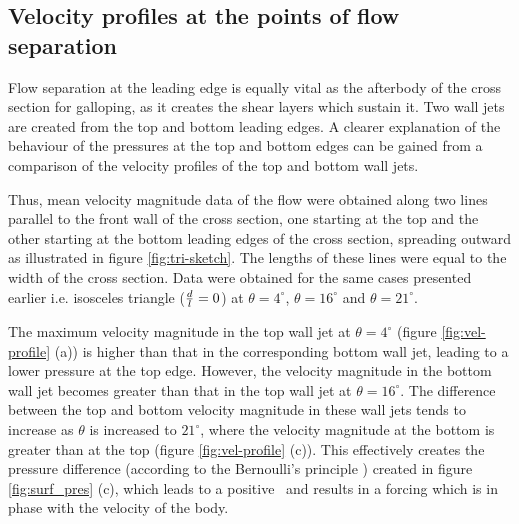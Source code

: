 \subsection{Velocity profiles at the points of flow separation}

Flow separation at the leading edge is equally vital as the afterbody of the cross section for galloping, as it creates the shear layers which sustain it. Two wall jets are created from the top and bottom leading edges. A clearer explanation of the behaviour of the pressures at the top and bottom edges can be gained from a comparison of the velocity profiles of the top and bottom wall jets.
 
 Thus, mean velocity magnitude data of the flow were obtained along two lines parallel to the front wall of the cross section, one starting at the top and the other starting at the bottom leading edges of the cross section, spreading outward as illustrated in figure \ref{fig:tri-sketch}. The lengths of these lines were equal to the width of the cross section. Data were obtained for the same cases presented earlier i.e. isosceles triangle ($\frac{d}{l}=0$) at $\theta=4^{\circ}$, $\theta=16^{\circ}$ and $\theta=21^{\circ}$.  






The maximum velocity magnitude in the top wall jet at $\theta= 4^{\circ}$ (figure \ref{fig:vel-profile} (a)) is higher than that in the corresponding bottom wall jet, leading to a lower pressure at the top edge. However, the velocity magnitude in the bottom wall jet becomes greater than that in the top wall jet at $\theta=16^{\circ}$. The difference between the top and bottom velocity magnitude in these wall jets tends to increase as $\theta$ is increased to $21^{\circ}$, where the velocity magnitude at the bottom is greater than at the top (figure \ref{fig:vel-profile} (c)). This effectively creates the pressure difference (according to the Bernoulli's principle ) created in figure \ref{fig:surf_pres} (c), which leads to a positive \cy\ and results in a forcing which is in phase with the velocity of the body. 







